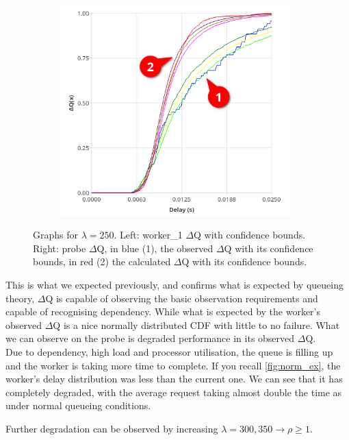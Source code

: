 \begin{figure}[H]
\begin{subfigure}{.5\textwidth}
                \includegraphics[width =0.98\textwidth]{img/overload_2/250_probe2.png}
                \label{fig:high_load_2}
            \end{subfigure}
            \caption{Graphs for $\lambda = 250$. Left: worker\_1 $\Delta$Q with confidence bounds. \\
            Right: probe $\Delta$Q, in blue (1), the observed $\Delta$Q with its confidence bounds, in red (2) the calculated $\Delta$Q with its confidence bounds.}
            \label{fig:early_ov}
        \end{figure}
    
    This is what we expected previously, and confirms what is expected by queueing theory, $\Delta$Q is capable of observing the basic observation requirements and capable of recognising dependency. While what is expected by the worker's observed $\Delta$Q is a nice normally distributed CDF with little to no failure. What we can observe on the probe is degraded performance in its observed $\Delta$Q. \\
    Due to dependency, high load and processor utilisation, the queue is filling up and the worker is taking more time to complete. If you recall \cref{fig:norm_ex}, the worker's delay distribution was less than the current one. We can see that it has completely degraded, with the average request taking almost double the time as under normal queueing conditions. 

    Further degradation can be observed by increasing $\lambda = {300, 350} \rightarrow \rho \ge 1$.

